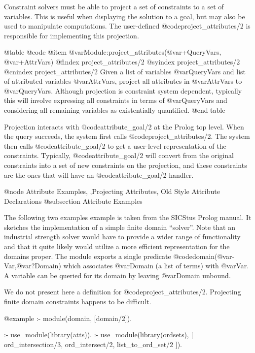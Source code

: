 {{{{{{{{Constraint solvers must be able to project a set of constraints to a set
of variables. This is useful when displaying the solution to a goal, but
may also be used to manipulate computations. The user-defined
@code{project_attributes/2} is responsible for implementing this
projection.


@table @code
@item @var{Module}:project_attributes(@var{+QueryVars}, @var{+AttrVars})
@findex project_attributes/2
@syindex project_attributes/2
@cnindex project_attributes/2
Given a list of variables @var{QueryVars} and list of attributed
variables @var{AttrVars}, project all attributes in @var{AttrVars} to
@var{QueryVars}. Although projection is constraint system dependent,
typically this will involve expressing all constraints in terms of
@var{QueryVars} and considering all remaining variables as existentially
quantified.
@end table

Projection interacts with @code{attribute_goal/2} at the Prolog top
level. When the query succeeds, the system first calls
@code{project_attributes/2}. The system then calls
@code{attribute_goal/2} to get a user-level representation of the
constraints. Typically, @code{attribute_goal/2} will convert from the
original constraints into a set of new constraints on the projection,
and these constraints are the ones that will have an
@code{attribute_goal/2} handler.

@node Attribute Examples, ,Projecting Attributes, Old Style Attribute Declarations
@subsection Attribute Examples

The following two examples example is taken from the SICStus Prolog manual. It
sketches the implementation of a simple finite domain ``solver''.  Note
that an industrial strength solver would have to provide a wider range
of functionality and that it quite likely would utilize a more efficient
representation for the domains proper.  The module exports a single
predicate @code{domain(@var{-Var},@var{?Domain})} which associates
@var{Domain} (a list of terms) with @var{Var}.  A variable can be
queried for its domain by leaving @var{Domain} unbound.

We do not present here a definition for @code{project_attributes/2}.
Projecting finite domain constraints happens to be difficult.


@example
:- module(domain, [domain/2]).

:- use_module(library(atts)).
:- use_module(library(ordsets), [
        ord_intersection/3,
        ord_intersect/2,
        list_to_ord_set/2
   ]).

}}}}}}}}
